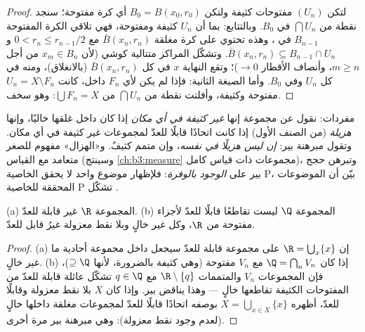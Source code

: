 \begin{proof}
لتكن $(U_n)$ مفتوحات كثيفة ولتكن $B_0 = B(x_0, r_0)$ أي كرة مفتوحة؛ سنجد
نقطة من $\bigcap U_n$ في $B_0$. وبالتتابع: بما أن $U_{n}$ كثيفة
ومفتوحة، فهي تلاقي الكرة المفتوحة $B_{n-1}$ في ،
وهذه تحتوي على كرة مغلقة $\bar B(x_n, r_n)$ مع $0 < r_n \leq r_{n-1}/2$ و $\bar B(x_n, r_n) \subseteq
B_{n-1}\cap U_n$. وتشكّل
المراكز متتالية كوشي (لأن $x_m \in
B_n$ من أجل $m \geq n$، وأنصاف
الأقطار $\to 0$)؛ وتقع النهاية $x$ في كل $\bar B(x_n, r_n)$ (بالانغلاق)،
ومنه في كل $U_n$ وفي $B_0$. وأما الصيغة الثانية: فإذا لم يكن
لأي $F_n$ داخل، كانت $U_n = X \setminus F_n$ مفتوحة وكثيفة، وأفلتت نقطة من
$\bigcap U_n$ من $\bigcup F_n = X$: وهو سخف.
\end{proof}

\begin{remark}\label{rem:b3:complete:meagre}
مفردات: نقول عن مجموعة إنها \emph{غير كثيفة في أي مكان} إذا كان
داخل غلقها خاليًا، وإنها \emph{هزيلة} (من
الصنف الأول) إذا كانت اتحادًا قابلًا للعدّ لمجموعات غير كثيفة في أي
مكان. وتقول مبرهنة بير: \emph{إن  ليس هزيلًا
في نفسه}، وإن متمم  كثيفٌ. و«الهزال» مفهوم للصغر
متعامد مع القياس (وسينتج \cref{ch:b3:measure} مجموعات  ذات قياس
كامل)، وتبرهن حجج بير على \emph{الوجود بالوفرة}: فلإظهار موضوع
واحد لا يحقق الخاصية P، بيّن أن الموضوعات المحققة للخاصية P تشكّل
.
\end{remark}

\begin{corollary}\label{cor:b3:complete:bairecors}
(a) المجموعة $\R$ غير قابلة للعدّ. (b) المجموعة $\Q$ ليست تقاطعًا
قابلًا للعدّ لأجزاء مفتوحة من $\R$، وكل  غير خالٍ وبلا
نقط معزولة غيرُ قابل للعدّ.
\end{corollary}

\begin{proof}
(a) إن $\R = \bigcup_{x}\{x\}$ على مجموعة قابلة للعدّ سيجعل داخل مجموعة أحادية ما غير
خالٍ. (b) إذا كان $\Q = \bigcap_n V_n$ مع $V_n$ مفتوحة (وهي كثيفة بالضرورة،
لأنها $\supseteq \Q$)، فإن المجموعات $V_n$ والمتممات $\R\setminus\{q\}$ مع
$q \in \Q$ تشكّل عائلة قابلة للعدّ من المفتوحات الكثيفة تقاطعها
خالٍ --- وهذا يناقض بير. وإذا كان $X$  بلا نقط معزولة
وقابلًا للعدّ، أظهره $X = \bigcup_{x \in X}\{x\}$ بوصفه اتحادًا قابلًا للعدّ لمجموعات مغلقة
داخلها خالٍ (لعدم وجود نقط معزولة): وهي مبرهنة بير مرة أخرى.
\end{proof}

